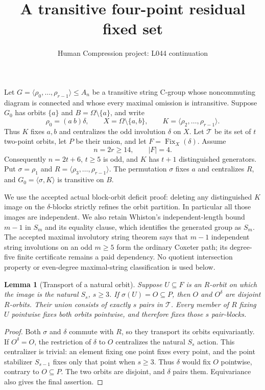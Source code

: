 \documentclass[11pt,a4paper]{article}
\title{A transitive four-point residual fixed set}
\author{Human Compression project: L044 continuation}
\date{}
\newtheorem{lemma}{Lemma}
\newcommand{\gen}[1]{\langle#1\rangle}
\begin{document}
\maketitle

Let $G=\gen{\rho_0,\ldots,\rho_{r-1}}\leq A_n$ be a transitive
string C-group whose noncommuting diagram is connected and whose every
maximal omission is intransitive. Suppose $G_0$ has orbits $\{a\}$ and
$B=\Omega\setminus\{a\}$, and write
\[
 \rho_0=(a\ b)\delta,\qquad X=\Omega\setminus\{a,b\},\qquad
 K=\gen{\rho_2,\ldots,\rho_{r-1}}.
\]
Thus $K$ fixes $a,b$ and centralizes the odd involution $\delta$ on $X$.
Let $\mathcal T$ be its set of $t$ two-point orbits, let $P$ be their
union, and let $F=\operatorname{Fix}_X(\delta)$. Assume
\[
 n=2r\geq14,\qquad |F|=4.
\]
Consequently $n=2t+6$, $t\geq5$ is odd, and $K$ has $t+1$ distinguished
generators. Put $\sigma=\rho_1$ and $R=\gen{\rho_3,\ldots,\rho_{r-1}}$.
The permutation $\sigma$ fixes $a$ and centralizes $R$, and
$G_0=\gen{\sigma,K}$ is transitive on $B$.

We use the accepted actual block-orbit deficit proof: deleting any
distinguished $K$ image on the $\delta$-blocks strictly refines the orbit
partition. In particular all those images are independent. We also retain
Whiston's independent-length bound $m-1$ in $S_m$ and its equality clause,
which identifies the generated group as $S_m$. The accepted maximal
involutory string theorem says that $m-1$ independent string involutions
on an odd $m\geq5$ form the ordinary Coxeter path; its degree-five finite
certificate remains a paid dependency. No quotient intersection property
or even-degree maximal-string classification is used below.

\begin{lemma}[Transport of a natural orbit]\label{transport}
Suppose $U\subseteq F$ is an $R$-orbit on which the image is the natural
$S_s$, $s\geq3$. If $\sigma(U)=O\subseteq P$, then $O$ and $O^\delta$
are disjoint $R$-orbits. Their union consists of exactly $s$ pairs in
$\mathcal T$. Every member of $R$ fixing $U$ pointwise fixes both orbits
pointwise, and therefore fixes those $s$ pair-blocks.
\end{lemma}
\begin{proof}
Both $\sigma$ and $\delta$ commute with $R$, so they transport its
orbits equivariantly. If $O^\delta=O$, the restriction of $\delta$ to $O$
centralizes the natural $S_s$ action. This centralizer is trivial: an
element fixing one point fixes every point, and the point stabilizer
$S_{s-1}$ fixes only that point when $s\geq3$. Thus $\delta$ would fix
$O$ pointwise, contrary to $O\subseteq P$. The two orbits are disjoint,
and $\delta$ pairs them. Equivariance also gives the final assertion.
\end{proof}
\end{document}
